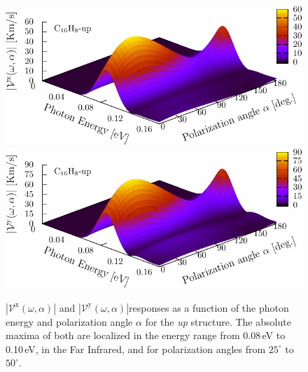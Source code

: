 \documentclass[prb,11pt,tightenlines,twocolumn,aps]{revtex4-1}
\begin{document}
\begin{figure}[t]
    \centering
    \includegraphics[width=\linewidth]{upplots/up-3d-vxb-1}
    \\
    \includegraphics[width=\linewidth]{upplots/up-3d-vyb-1}
    
    \caption{ $|\mathcal{V}^{\mathrm{x}}(\omega,\alpha)|$ and
    $|\mathcal{V}^{\mathrm{y}}(\omega,\alpha)|$responses as a function of the
    photon energy and polarization angle $\alpha$ for the \emph{up} structure.
    The absolute maxima of both are localized in the energy range from 0.08\,eV
    to 0.10\,eV, in the Far  Infrared, and for polarization angles from
    $25^{\circ}$ to $50^{\circ}$.}
    \label{fig:up-3d-vva-1}
\end{figure}
\end{document}
